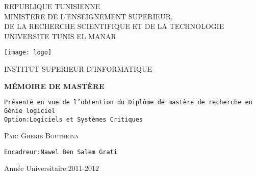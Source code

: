 \documentclass[a4paper,12pt,titlepage]{report}
\begin{document}
\begin{titlepage}


\begin{minipage}[b]{\linewidth}
\begin{center}
\color{blue}
\textsc{REPUBLIQUE TUNISIENNE \\
MINISTERE DE L'ENSEIGNEMENT SUPERIEUR,\\
DE LA RECHERCHE SCIENTIFIQUE ET DE LA TECHNOLOGIE \\
UNIVERSITE TUNIS EL MANAR }

\texttt{[image: logo]}

\end{center}
\end{minipage}


\begin{minipage}[b]{\linewidth}
\centerline{
\color{myblue}
\textsc{INSTITUT SUPERIEUR D'INFORMATIQUE}
}
\end{minipage}
\par
\vspace{1cm}

\begin{minipage}[b]{\linewidth}
\begin{center}
\color{black}
\textsc{\textbf{MÉMOIRE DE MASTÈRE}}
\end{center}
\end{minipage}
\vspace{1cm}

\begin{minipage}[b]{\linewidth}
\begin{center}
\texttt{Présenté en vue de l'obtention du 
Diplôme de mastère de recherche en Génie logiciel \\
Option:Logiciels et Systèmes Critiques }
\end{center}
\end{minipage}
\vspace{1.5cm}

\hspace{4cm}\begin{minipage}[b]{0.5\linewidth}
\textsc{Par: Gherib Boutheina}
\end{minipage}
\vspace{1.5cm}

\begin{center}
\end{center}
\vspace{4cm}

\begin{minipage}[b]{\linewidth}
\texttt{Encadreur:Nawel Ben Salem Grati}
\vspace{2cm}

{\large Année Universitaire:2011-2012}
\end{minipage}

\end{titlepage}
\end{document}
